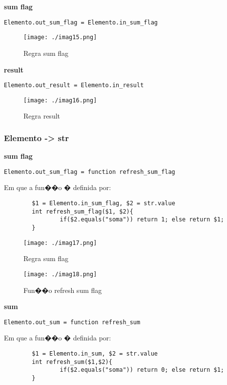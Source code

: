 \documentclass[a4paper]{article}
\begin{document}
\textbf{sum flag}\\
\begin{verbatim}
Elemento.out_sum_flag = Elemento.in_sum_flag
\end{verbatim}
\begin{figure}[H]
 \centering
 \texttt{[image: ./imag15.png]}
 \caption{Regra sum flag}
\end{figure}


\textbf{result}\\
\begin{verbatim}
Elemento.out_result = Elemento.in_result
\end{verbatim}
\begin{figure}[H]
 \centering
 \texttt{[image: ./imag16.png]}
 \caption{Regra result}
\end{figure}



\subsubsection{Elemento -> str}
\textbf{sum flag}\\

\begin{verbatim}
Elemento.out_sum_flag = function refresh_sum_flag
\end{verbatim}
Em que a fun��o � definida por:
\begin{verbatim}
        $1 = Elemento.in_sum_flag, $2 = str.value
        int refresh_sum_flag($1, $2){
                if($2.equals("soma")) return 1; else return $1;
        }
\end{verbatim}

\begin{figure}[H]
 \centering
 \texttt{[image: ./imag17.png]}
 \caption{Regra sum flag}
\end{figure}

\begin{figure}[H]
 \centering
 \texttt{[image: ./imag18.png]}
 \caption{Fun��o refresh sum flag}
\end{figure}

\textbf{sum}\\
\begin{verbatim}
Elemento.out_sum = function refresh_sum
\end{verbatim}
Em que a fun��o � definida por:
\begin{verbatim}
        $1 = Elemento.in_sum, $2 = str.value
        int refresh_sum($1,$2){
                if($2.equals("soma")) return 0; else return $1; 
        }
\end{verbatim}
\end{document}
